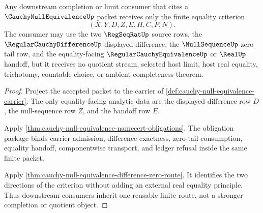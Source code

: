 \begin{theorem}
\label{thm:cauchy-null-equivalence-downstream-equality-surface}
Any downstream completion or limit consumer that cites a $\CauchyNullEquivalenceUp$ packet receives only the finite equality criterion
$$
(X,Y,D,Z,E,H,C,P,N).
$$
The consumer may use the two $\RegSeqRatUp$ source rows, the $\RegularCauchyDifferenceUp$ displayed difference, the $\NullSequenceUp$ zero-tail row, and the equality-facing $\RegularCauchyEquivalenceUp$ or $\RealUp$ handoff, but it receives no quotient stream, selected host limit, host real equality, trichotomy, countable choice, or ambient completeness theorem.
\end{theorem}
\begin{proof}
Project the accepted packet to the carrier of \autoref{def:cauchy-null-equivalence-carrier}. The only equality-facing analytic data are the displayed difference row $D$, the null-sequence row $Z$, and the handoff row $E$.

Apply \autoref{thm:cauchy-null-equivalence-namecert-obligations}. The obligation package binds carrier admission, difference exactness, zero-tail consumption, equality handoff, componentwise transport, and ledger refusal inside the same finite packet.

Apply \autoref{thm:cauchy-null-equivalence-difference-zero-route}. It identifies the two directions of the criterion without adding an external real equality principle. Thus downstream consumers inherit one reusable finite route, not a stronger completion or quotient object.
\end{proof}

